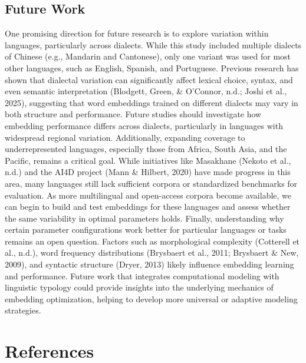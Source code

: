 \documentclass[
  english,
  man,floatsintext]{apa6}
\begin{document}
\subsection{Future Work}\label{future-work}

One promising direction for future research is to explore variation within languages, particularly across dialects. While this study included multiple dialects of Chinese (e.g., Mandarin and Cantonese), only one variant was used for most other languages, such as English, Spanish, and Portuguese. Previous research has shown that dialectal variation can significantly affect lexical choice, syntax, and even semantic interpretation (Blodgett, Green, \& O'Connor, n.d.; Joshi et al., 2025), suggesting that word embeddings trained on different dialects may vary in both structure and performance. Future studies should investigate how embedding performance differs across dialects, particularly in languages with widespread regional variation. Additionally, expanding coverage to underrepresented languages, especially those from Africa, South Asia, and the Pacific, remains a critical goal. While initiatives like Masakhane (Nekoto et al., n.d.) and the AI4D project (Mann \& Hilbert, 2020) have made progress in this area, many languages still lack sufficient corpora or standardized benchmarks for evaluation. As more multilingual and open-access corpora become available, we can begin to build and test embeddings for these languages and assess whether the same variability in optimal parameters holds. Finally, understanding why certain parameter configurations work better for particular languages or tasks remains an open question. Factors such as morphological complexity (Cotterell et al., n.d.), word frequency distributions (Brysbaert et al., 2011; Brysbaert \& New, 2009), and syntactic structure (Dryer, 2013) likely influence embedding learning and performance. Future work that integrates computational modeling with linguistic typology could provide insights into the underlying mechanics of embedding optimization, helping to develop more universal or adaptive modeling strategies.

\newpage

\section{References}\label{references}
\end{document}
